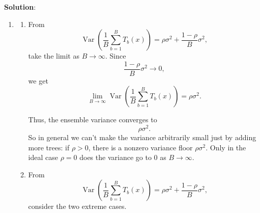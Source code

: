 \documentclass[submit]{harvardml}
\newenvironment{solution}{
    \vspace{2mm}
    \color{blue}\noindent\textbf{Solution}:
}{}
\begin{document}
\begin{solution}
\begin{enumerate}
\begin{enumerate}
Using the variance of a scaled sum,
\[
\operatorname{Var}\!\left(\frac{1}{B}\sum_{b=1}^B T_b(x)\right)
=
\frac{1}{B^2}\operatorname{Var}\!\left(\sum_{b=1}^B T_b(x)\right).
\]
Now expand the variance of the sum:
\[
\operatorname{Var}\!\left(\sum_{b=1}^B T_b(x)\right)
=
\sum_{i=1}^B \operatorname{Var}(T_i(x))
+
\sum_{i\neq j}\operatorname{Cov}(T_i(x),T_j(x)).
\]

By assumption, for every tree,
\[
\operatorname{Var}(T_b(x))=\sigma^2,
\]
so the diagonal terms contribute
\[
\sum_{i=1}^B \operatorname{Var}(T_i(x)) = B\sigma^2.
\]

Also, for \(i\neq j\),
\[
\operatorname{Corr}(T_i(x),T_j(x))=\rho,
\]
and since each tree has variance \(\sigma^2\),
\[
\operatorname{Cov}(T_i(x),T_j(x))
=
\rho \sqrt{\operatorname{Var}(T_i(x))\operatorname{Var}(T_j(x))}
=
\rho \sigma^2.
\]
There are \(B(B-1)\) off-diagonal pairs \((i,j)\) with \(i\neq j\), so
\[
\sum_{i\neq j}\operatorname{Cov}(T_i(x),T_j(x))
=
B(B-1)\rho\sigma^2.
\]

Therefore,
\[
\operatorname{Var}\!\left(\sum_{b=1}^B T_b(x)\right)
=
B\sigma^2 + B(B-1)\rho\sigma^2.
\]
Substitute back:
\[
\operatorname{Var}(\bar T(x))
=
\frac{1}{B^2}\left(B\sigma^2 + B(B-1)\rho\sigma^2\right).
\]


\[
\operatorname{Var}(\bar T(x))
=
\frac{\sigma^2}{B^2}\,B\bigl(1+(B-1)\rho\bigr)
=
\frac{\sigma^2}{B}\bigl(1+(B-1)\rho\bigr).
\]

\[
\operatorname{Var}(\bar T(x))
=
\frac{\sigma^2}{B} + \frac{(B-1)\rho\sigma^2}{B}.
\]

\[
\operatorname{Var}(\bar T(x))
=
\rho\sigma^2 + \frac{1-\rho}{B}\sigma^2.
\]

Hence,
\[
\boxed{
\operatorname{Var}\!\left(\frac{1}{B}\sum_{b=1}^B T_b(x)\right)
=
\rho \sigma^2 + \frac{1-\rho}{B}\sigma^2
}.
\]
            \item \begin{enumerate}
                \item From
\[
\operatorname{Var}\!\left(\frac{1}{B}\sum_{b=1}^B T_b(x)\right)
=
\rho \sigma^2 + \frac{1-\rho}{B}\sigma^2,
\]
take the limit as \(B\to\infty\). Since
\[
\frac{1-\rho}{B}\sigma^2 \to 0,
\]
we get
\[
\lim_{B\to\infty}\operatorname{Var}\!\left(\frac{1}{B}\sum_{b=1}^B T_b(x)\right)
=
\rho\sigma^2.
\]

Thus, the ensemble variance converges to
\[
\boxed{\rho\sigma^2.}
\]
So in general we can't make the variance arbitrarily small just by adding more trees: if \(\rho>0\), there is a nonzero variance floor \(\rho\sigma^2\). Only in the ideal case \(\rho=0\) does the variance go to \(0\) as \(B\to\infty\).
                \item From
\[
\operatorname{Var}\!\left(\frac{1}{B}\sum_{b=1}^B T_b(x)\right)
=
\rho \sigma^2 + \frac{1-\rho}{B}\sigma^2,
\]
consider the two extreme cases.


\end{enumerate}
\end{enumerate}
\end{enumerate}
\end{solution}
\end{document}
